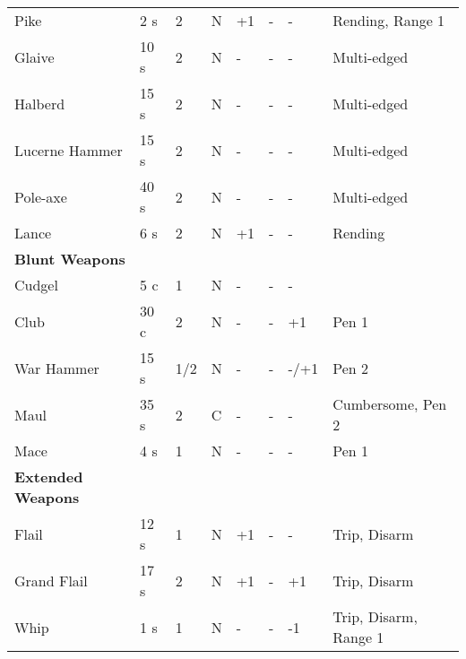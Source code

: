 \documentclass[a4paper,11pt,oneside]{book}
\begin{document}
\begin{table}[ht!]
\begin{tabular}{|l|l|l|l|l|l|l|l|}
		Pike & 2 s & 2 & N & +1 & - & - & Rending, Range 1\\
		Glaive & 10 s & 2 & N & - & - & - & Multi-edged \\
		Halberd & 15 s & 2 & N & - & - & - & Multi-edged\\
		Lucerne Hammer & 15 s & 2 & N & - & - & - & Multi-edged\\ 
		Pole-axe & 40 s & 2 & N & - & - & - & Multi-edged \\
		Lance & 6 s & 2 & N & +1 & - & - & Rending\\
		\hline
		\textbf{Blunt Weapons} & & & & & & & \\
		\hline
		Cudgel & 5 c & 1  & N & - & - & - &  \\
		Club & 30 c & 2 & N & - & - & +1 & Pen 1 \\
		War Hammer & 15 s & 1/2 & N & - & - & -/+1 & Pen 2 \\ 
		Maul & 35 s & 2 & C & - & - & - & Cumbersome, Pen 2 \\
		Mace & 4 s & 1 & N & - & - & - & Pen 1 \\
		\hline
		\textbf{Extended Weapons} & & & & & & & \\
		\hline
		Flail & 12 s & 1 & N & +1 & - & - & Trip, Disarm \\ 
		Grand Flail & 17 s & 2 & N & +1 & - & +1 & Trip, Disarm\\
		Whip & 1 s & 1 & N & - & - & -1 & Trip, Disarm, Range 1\\
		\hline
	\end{tabular}
\end{table}
\end{document}
